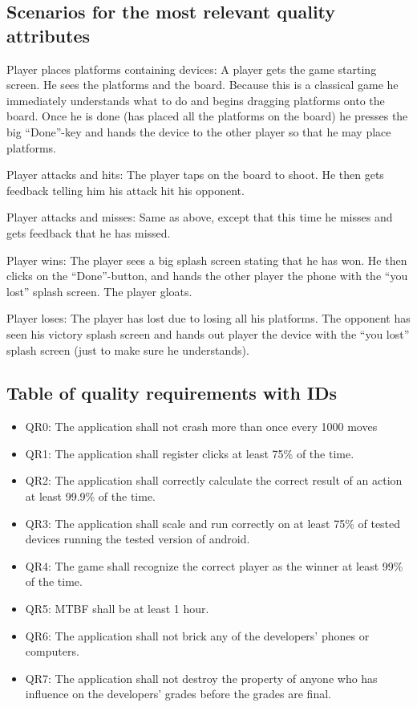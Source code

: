 \documentclass[12pt, a4paper]{article}
\begin{document}
\subsection{Scenarios for the most relevant quality attributes}
Player places platforms containing devices: A player gets the game starting screen. He sees the platforms and the board. Because this is a classical game he immediately understands what to do and begins dragging platforms onto the board. Once he is done (has placed all the platforms on the board) he presses the big “Done”-key and hands the device to the other player so that he may place platforms.

		Player attacks and hits: The player taps on the board to shoot. He then gets feedback telling him his attack hit his opponent.

		Player attacks and misses: Same as above, except that this time he misses and gets feedback that he has missed.

Player wins: The player sees a big splash screen stating that he has won. He
then clicks on the “Done”-button, and hands the other player the phone with the “you lost” splash screen. The player gloats.

		Player loses: The player has lost due to losing all his platforms. The opponent has seen his victory splash screen and hands out player the device with the “you lost” splash screen (just to make sure he understands).

\subsection{Table of quality requirements with IDs}
\begin{itemize}

\item QR0: The application shall not crash more than once every 1000 moves
\item QR1: The application shall register clicks at least 75\% of the time.
\item QR2: The application shall correctly calculate the correct result of an action at least 99.9\% of the time.
\item QR3: The application shall scale and run correctly on at least 75\% of tested devices running the tested version of android.
\item QR4: The game shall recognize the correct player as the winner at least 99\% of the time.
\item QR5: MTBF shall be at least 1 hour.
\item QR6: The application shall not brick any of the developers’ phones or computers.
\item QR7: The application shall not destroy the property of anyone who has influence on  the developers’ grades before the grades are final.

\end{itemize}
\end{document}
